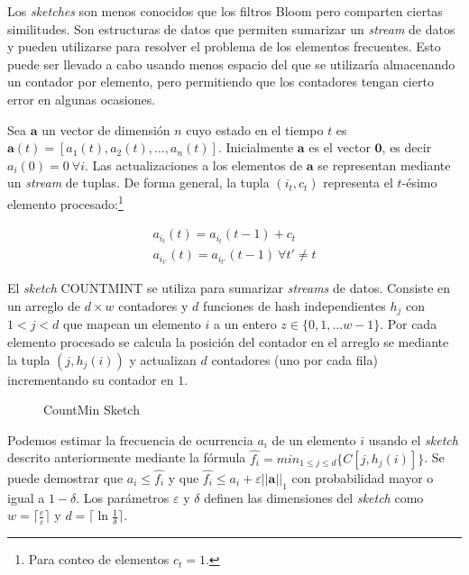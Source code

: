 \documentclass[a4paper,10pt, oneside]{article}
\begin{document}
Los \textit{sketches} son menos conocidos que los filtros Bloom pero comparten ciertas similitudes. Son estructuras de datos que permiten sumarizar un \textit{stream} de datos y pueden utilizarse para resolver el problema de los elementos frecuentes. Esto puede ser llevado a cabo usando menos espacio del que se utilizaría almacenando un contador por elemento, pero permitiendo que los contadores tengan cierto error en algunas ocasiones.

Sea $\mathbf{a}$ un vector de dimensión $n$ cuyo estado en el tiempo $t$ es $\mathbf{a}(t)=[a_1(t), a_2(t), \dots, a_n(t)]$. Inicialmente $\mathbf{a}$ es el vector $\mathbf{0}$, es decir $a_i(0)=0 \ \forall i$. Las actualizaciones a los elementos de $\mathbf{a}$ se representan mediante un \textit{stream} de tuplas. De forma general, la tupla $(i_t, c_t)$ representa el $t$-ésimo elemento procesado:\footnote{Para conteo de elementos $c_t=1$.}

\begin{gather*}
	a_{i_t}(t)=a_{i_t}(t-1) + c_t\\
	a_{i_{t'}}(t)=a_{i_{t'}}(t-1) \ \forall t' \neq t 
\end{gather*}

El \textit{sketch} COUNTMINT\cite{Cormode:2005:IDS:1073713.1073718} se utiliza para sumarizar \textit{streams} de datos. Consiste en un arreglo de $d \times w$ contadores y $d$ funciones de hash independientes $h_j$ con $1<j<d$ que mapean un elemento $i$ a un entero $z \in \{0, 1, \dots w-1\}$. Por cada elemento procesado se calcula la posición del contador en el arreglo se mediante la tupla $(j,h_j(i))$ y actualizan $d$ contadores (uno por cada fila) incrementando su contador en $1$.

\begin{figure}[htbp]
	\centering
	
	\caption{CountMin Sketch}
	
	\medskip
	\small
	
	\parbox{13.1cm}{}
	
\end{figure}


Podemos estimar la frecuencia de ocurrencia $a_i$ de un elemento $i$ usando el \textit{sketch} descrito anteriormente mediante la fórmula $\hat{f_i} = min_{1 \leq j \leq d}\{C[j,h_j(i)]\}$. Se puede demostrar que $a_i \leq \hat{f_i}$ y que $\hat{f_i} \leq a_i + \varepsilon ||\mathbf{a}||_1$ con probabilidad mayor o igual a $1-\delta$. Los parámetros $\varepsilon$ y $\delta$ definen las dimensiones del \textit{sketch} como $w=\lceil \frac{e}{\varepsilon}\rceil$ y $d=\lceil \ln \frac{1}{\delta} \rceil$.
\end{document}
